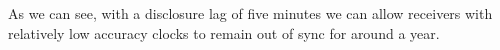 As we can see, with a disclosure lag of five minutes we can allow receivers with
relatively low accuracy clocks to remain out of sync for around a year.

